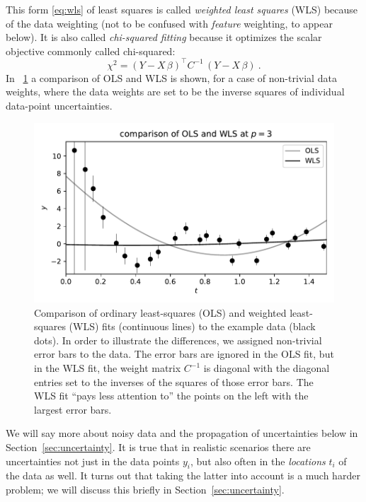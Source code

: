 \documentclass[12pt,letterpaper]{article}
\newlength{\figurewidth}
\newcommand{\sectionname}{Section}
\begin{document}
This form \eqref{eq:wls} of least squares is called \emph{weighted least squares} (WLS) because of the data weighting (not to be confused with \emph{feature} weighting, to appear below).
It is also called \emph{chi-squared fitting} because it optimizes the scalar objective commonly called chi-squared:
\begin{equation}
    \chi^2 = (Y - X\,\beta)^\top C^{-1}\,(Y - X\,\beta)
    ~.
\end{equation}
In \figurename~\ref{fig:wls} a comparison of OLS and WLS is shown, for a case of non-trivial data weights, where the data weights are set to be the inverse squares of individual data-point uncertainties.
\begin{figure}[t]
    \begin{mdframed}
    \includegraphics[width=\figurewidth]{./WLS.pdf}
    \caption{Comparison of ordinary least-squares (OLS) and weighted least-squares (WLS) fits (continuous lines) to the example data (black dots). In order to illustrate the differences, we assigned non-trivial error bars to the data. The error bars are ignored in the OLS fit, but in the WLS fit, the weight matrix $C^{-1}$ is diagonal with the diagonal entries set to the inverses of the squares of those error bars. The WLS fit ``pays less attention to'' the points on the left with the largest error bars.}
    \label{fig:wls}
    \end{mdframed}
\end{figure}

We will say more about noisy data and the propagation of uncertainties below in \sectionname~\ref{sec:uncertainty}.
It is true that in realistic scenarios there are uncertainties not just in the data points $y_i$, but also often in the \emph{locations} $t_i$ of the data as well. It turns out that taking the latter into account is a much harder problem; we will discuss this briefly in \sectionname~\ref{sec:uncertainty}.
\end{document}
